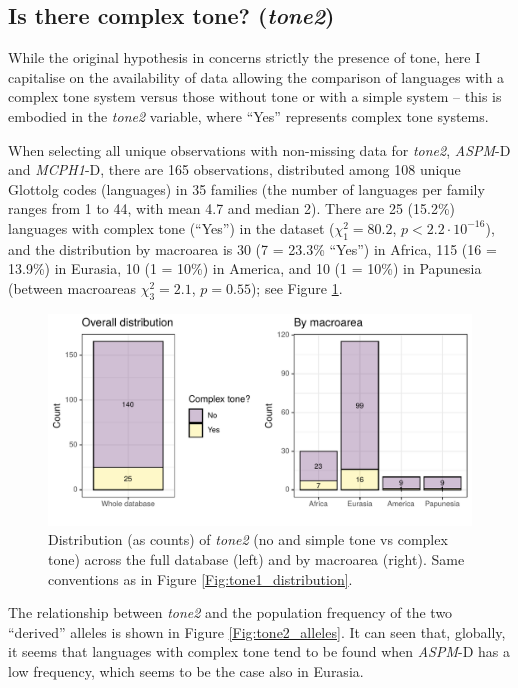 \documentclass[twoside,onecolumn]{article}
\begin{document}
\subsection{Is there complex tone? (\textit{tone2})}

While the original hypothesis in \citet{dediu_ladd_2007} concerns strictly the presence of tone, here I capitalise on the availability of data allowing the comparison of languages with a complex tone system versus those without tone or with a simple system -- this is embodied in the \textit{tone2} variable, where ``Yes'' represents complex tone systems.

When selecting all unique observations with non-missing data for \textit{tone2}, \textit{ASPM}-D and \textit{MCPH1}-D, there are 165 observations, distributed among 108 unique Glottolg codes (languages) in 35 families (the number of languages per family ranges from 1 to 44, with mean 4.7 and median 2).
There are 25 (15.2\%) languages with complex tone (``Yes'') in the dataset ($\chi^2_{1} = 80.2$, $p < 2.2\cdot10^{-16}$), and the distribution by macroarea is 30 (7 = 23.3\% ``Yes'') in Africa, 115 (16 = 13.9\%) in Eurasia, 10 (1 = 10\%) in America, and 10 (1 = 10\%) in Papunesia (between macroareas $\chi^2_{3} = 2.1$, $p = 0.55$); see Figure \ref{Fig:tone2_distribution}.

\begin{figure}[h]
  \centering
  \includegraphics[width=\textwidth]{../../code/figures/tone2_distribution}
  \caption{Distribution (as counts) of \textit{tone2} (no and simple tone vs complex tone) across the full database (left) and by macroarea (right). Same conventions as in Figure \ref{Fig:tone1_distribution}.}
  \label{Fig:tone2_distribution}
\end{figure}

The relationship between \textit{tone2} and the population frequency of the two ``derived'' alleles is shown in Figure \ref{Fig:tone2_alleles}.
It can seen that, globally, it seems that languages with complex tone tend to be found when \textit{ASPM}-D has a low frequency, which seems to be the case also in Eurasia.
\end{document}
